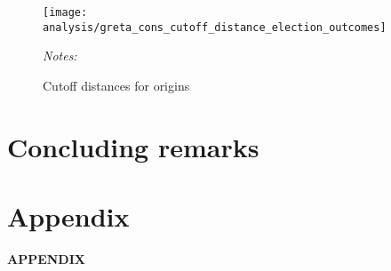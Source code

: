 \documentclass[11pt, a4paper]{article} %
\begin{document}
\begin{figure}[H]\centering
	\caption{Cutoff distances for origins}\label{fig_greta_cons:origin_cutoff_distances}
	\texttt{[image: analysis/greta\_cons\_cutoff\_distance\_election\_outcomes]}
	\begin{minipage}{0.9\linewidth}
		\scriptsize{\emph{Notes:} }
	\end{minipage}
\end{figure}





\bigskip
\section{Concluding remarks}\label{sec_greta_cons:conclusion}




\newpage











\newpage
\TODO\section{Appendix}
\vspace*{\fill}
{\Huge \begin{center}\textbf{APPENDIX}\end{center}}
\vspace*{\fill}\clearpage


\renewcommand\thefigure{A.\arabic{figure}}
\setcounter{figure}{0} 
\captionsetup[subfigure]{labelformat=parens}




\end{document}
